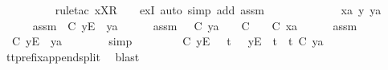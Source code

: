 \begin{isabellebody}
\ \ \ \ \ \ \ \ \isamarkupfalse%
\ {\isacharparenleft}rule{\isacharunderscore}tac\ x{\isacharequal}{\isachardoublequoteopen}{\isacharbrackleft}X{\isacharbrackright}\isactrlsub R\ {\isacharhash}\ {\isasymrho}{\isacharprime}{\isachardoublequoteclose}\ \ exI{\isacharcomma}\ auto\ simp\ add{\isacharcolon}\ assm{}{\isacharparenright}\isanewline
\ \ \ \ \isamarkupfalse%
\isanewline
\ \ \isamarkupfalse%
\isanewline
\ \ \ \ \isamarkupfalse%
\ xa\ y\ ya\ {\isasymsigma}{\isacharprime}\isanewline
\ \ \ \ \isamarkupfalse%
\ assm{}{\isacharcolon}\ {\isachardoublequoteopen}{\isasymsigma}{\isacharprime}\ {\isasymle}\isactrlsub C\ {\isacharbrackleft}y{\isacharbrackright}\isactrlsub E\ {\isacharhash}\ ya{\isachardoublequoteclose}\isanewline
\ \ \ \ \isamarkupfalse%
\ assm{}{\isacharcolon}\ {\isachardoublequoteopen}{\isacharparenleft}{\isasymAnd}{\isasymsigma}{\isacharprime}{\isachardot}\ {\isasymsigma}{\isacharprime}\ {\isasymle}\isactrlsub C\ ya\ {\isasymLongrightarrow}\ {\isasymexists}{\isasymrho}{\isacharprime}{\isachardot}\ {\isasymrho}{\isacharprime}\ {\isasymsubseteq}\isactrlsub C\ {\isasymsigma}{\isacharprime}\ {\isasymand}\ {\isasymrho}{\isacharprime}\ {\isasymle}\isactrlsub C\ xa{\isacharparenright}{\isachardoublequoteclose}\isanewline
\ \ \ \ \isamarkupfalse%
\ assm{}\ \isamarkupfalse%
\ {\isachardoublequoteopen}{\isasymsigma}{\isacharprime}\ {\isasymle}\isactrlsub C\ {\isacharbrackleft}{\isacharbrackleft}y{\isacharbrackright}\isactrlsub E{\isacharbrackright}\ {\isacharat}\ ya{\isachardoublequoteclose}\isanewline
\ \ \ \ \ \ \isamarkupfalse%
\ simp\isanewline
\ \ \ \ \isamarkupfalse%
\ \isamarkupfalse%
\ {\isachardoublequoteopen}{\isasymsigma}{\isacharprime}\ {\isasymle}\isactrlsub C\ {\isacharbrackleft}{\isacharbrackleft}y{\isacharbrackright}\isactrlsub E{\isacharbrackright}\ \ {\isasymor}\ {\isacharparenleft}{\isasymexists}t{\isacharprime}{\isachardot}\ {\isasymsigma}{\isacharprime}\ {\isacharequal}\ {\isacharbrackleft}{\isacharbrackleft}y{\isacharbrackright}\isactrlsub E{\isacharbrackright}\ {\isacharat}\ t{\isacharprime}\ {\isasymand}\ t{\isacharprime}\ {\isasymle}\isactrlsub C\ ya{\isacharparenright}{\isachardoublequoteclose}\isanewline
\ \ \ \ \ \ \isamarkupfalse%
\ tt{\isacharunderscore}prefix{\isacharunderscore}append{\isacharunderscore}split\ \isamarkupfalse%
\ blast\isanewline

\end{isabellebody}
